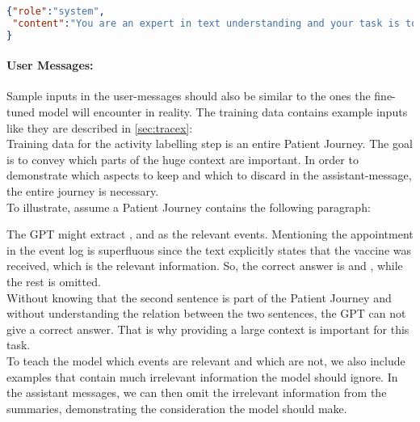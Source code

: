 \begin{lstlisting}[language=json, caption={System message for determining an activities start timestamp}, label={lst:system:starttime}, float=ht]
{"role":"system",
 "content":"You are an expert in text understanding and your task is to take a given text and a given activity label  and to extract a start date to this activity label. Only output the extracted start date! Rely on the context to determine the start date, as it might not be explicitly mentioned."
}
\end{lstlisting}

\paragraph{User Messages:}\label{par:user-messages} Sample inputs in the user-messages should also be similar to the ones the fine-tuned model will encounter in reality. The training data contains example inputs like they are described in \autoref{sec:tracex}:\\
Training data for the activity labelling step is an entire Patient Journey. The goal is to convey which parts of the huge context are important. In order to demonstrate which aspects to keep and which to discard in the assistant-message, the entire journey is necessary.\\
To illustrate, assume a Patient Journey contains the following paragraph:
\begin{quote}
\end{quote}
The GPT might extract ,  and  as the relevant events. Mentioning the appointment in the event log is superfluous since the text explicitly states that the vaccine was received, which is the relevant information. So, the correct answer is  and , while the rest is omitted.\\
Without knowing that the second sentence is part of the Patient Journey and without understanding the relation between the two sentences, the GPT can not give a correct answer. That is why providing a large context is important for this task.\\
To teach the model which events are relevant and which are not, we also include examples that contain much irrelevant information the model should ignore. In the assistant messages, we can then omit the irrelevant information from the summaries, demonstrating the consideration the model should make.\\
